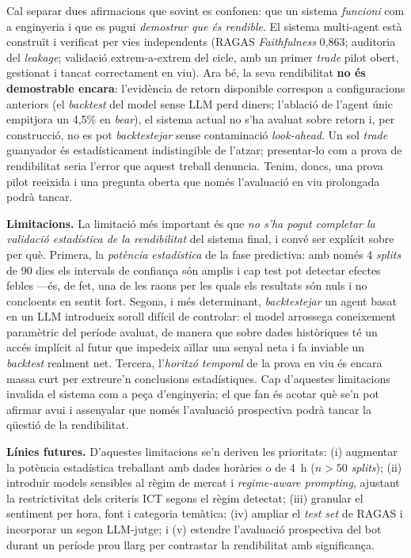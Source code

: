 \documentclass[10pt,twocolumn,a4paper]{article}
\begin{document}
Cal separar dues afirmacions que sovint es confonen: que un sistema \emph{funcioni}
com a enginyeria i que es pugui \emph{demostrar que és rendible}. El sistema
multi-agent està construït i verificat per vies independents (RAGAS
\textit{Faithfulness} 0,863; auditoria del \textit{leakage}; validació
extrem-a-extrem del cicle, amb un primer \textit{trade} pilot obert, gestionat i
tancat correctament en viu). Ara bé, la seva rendibilitat \textbf{no és demostrable
encara}: l'evidència de retorn disponible correspon a configuracions anteriors (el
\textit{backtest} del model sense LLM perd diners; l'ablació de l'agent únic
empitjora un 4,5\% en \textit{bear}), el sistema actual no s'ha avaluat sobre
retorn i, per construcció, no es pot \textit{backtestejar} sense contaminació
\textit{look-ahead}. Un sol \textit{trade} guanyador és estadísticament
indistingible de l'atzar; presentar-lo com a prova de rendibilitat seria l'error
que aquest treball denuncia. Tenim, doncs, una prova pilot reeixida i una pregunta
oberta que només l'avaluació en viu prolongada podrà tancar.

\textbf{Limitacions.} La limitació més important és que \emph{no s'ha pogut completar
la validació estadística de la rendibilitat} del sistema final, i convé ser explícit
sobre per què. Primera, la \emph{potència estadística} de la fase predictiva: amb
només 4 \textit{splits} de 90 dies els intervals de confiança són amplis i cap test
pot detectar efectes febles ---és, de fet, una de les raons per les quals els
resultats són nuls i no concloents en sentit fort. Segona, i més determinant,
\textit{backtestejar} un agent basat en un LLM introdueix soroll difícil de
controlar: el model arrossega coneixement paramètric del període avaluat, de manera
que sobre dades històriques té un accés implícit al futur que impedeix aïllar una
senyal neta i fa inviable un \textit{backtest} realment net. Tercera, l'\emph{horitzó
temporal} de la prova en viu és encara massa curt per extreure'n conclusions
estadístiques. Cap d'aquestes limitacions invalida el sistema com a peça
d'enginyeria; el que fan és acotar què se'n pot afirmar avui i assenyalar que només
l'avaluació prospectiva podrà tancar la qüestió de la rendibilitat.

\textbf{Línies futures.} D'aquestes limitacions se'n deriven les prioritats:
(i) augmentar la potència estadística treballant amb dades horàries o de 4~h
($n>50$ \textit{splits}); (ii) introduir models sensibles al règim de mercat i
\emph{regime-aware prompting}, ajustant la restrictivitat dels criteris ICT segons
el règim detectat; (iii) granular el sentiment per hora, font i categoria temàtica;
(iv) ampliar el \textit{test set} de RAGAS i incorporar un segon LLM-jutge; i
(v) estendre l'avaluació prospectiva del bot durant un període prou llarg per
contrastar la rendibilitat amb significança.
\end{document}
